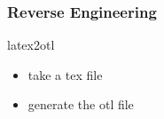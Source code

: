 \documentclass[nototal,handout]{beamer}
\begin{document}
\begin{frame}
	\frametitle{Reverse Engineering}
 
\begin{block}{latex2otl}
 \begin{itemize}
 \item take a tex file
 \item generate the otl file
 \end{itemize}
 \end{block} \end{frame} 


\section{} 


\section{}
\end{document}
